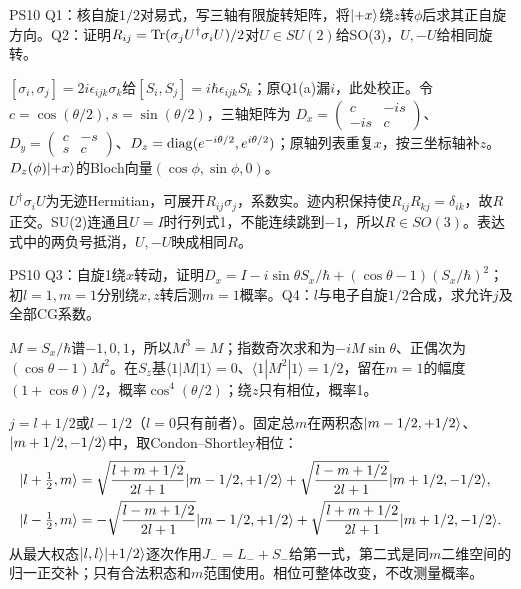 \begin{exercise}
PS10 Q1：核自旋$1/2$对易式，写三轴有限旋转矩阵，将$\lvert +x\rangle$绕$z$转$\phi$后求其正自旋方向。Q2：证明$R_{ij}=\operatorname{Tr}(\sigma_jU^\dagger\sigma_iU)/2$对$U\in SU(2)$给SO(3)，$U,-U$给相同旋转。
\end{exercise}
\begin{solution}
$[\sigma_i,\sigma_j]=2i\epsilon_{ijk}\sigma_k$给$[S_i,S_j]=i\hbar\epsilon_{ijk}S_k$；原Q1(a)漏$i$，此处校正。令$c=\cos(\theta/2),s=\sin(\theta/2)$，三轴矩阵为
$D_x=\begin{pmatrix}c&-is\\-is&c\end{pmatrix}$、$D_y=\begin{pmatrix}c&-s\\s&c\end{pmatrix}$、$D_z=\operatorname{diag}(e^{-i\theta/2},e^{i\theta/2})$；原轴列表重复$x$，按三坐标轴补$z$。$D_z(\phi)\lvert +x\rangle$的Bloch向量$(\cos\phi,\sin\phi,0)$。

$U^\dagger\sigma_iU$为无迹Hermitian，可展开$R_{ij}\sigma_j$，系数实。迹内积保持使$R_{ij}R_{kj}=\delta_{ik}$，故$R$正交。SU(2)连通且$U=I$时行列式1，不能连续跳到$-1$，所以$R\in SO(3)$。表达式中的两负号抵消，$U,-U$映成相同$R$。
\end{solution}
\begin{exercise}
PS10 Q3：自旋1绕$x$转动，证明$D_x=I-i\sin\theta S_x/\hbar+(\cos\theta-1)(S_x/\hbar)^2$；初$l=1,m=1$分别绕$x,z$转后测$m=1$概率。Q4：$l$与电子自旋$1/2$合成，求允许$j$及全部CG系数。
\end{exercise}
\begin{solution}
$M=S_x/\hbar$谱$-1,0,1$，所以$M^3=M$；指数奇次求和为$-iM\sin\theta$、正偶次为$(\cos\theta-1)M^2$。在$S_z$基$\langle1|M|1\rangle=0$、$\langle1|M^2|1\rangle=1/2$，留在$m=1$的幅度$(1+\cos\theta)/2$，概率$\cos^4(\theta/2)$；绕$z$只有相位，概率1。

$j=l+1/2$或$l-1/2$（$l=0$只有前者）。固定总$m$在两积态$\lvert m-1/2,+1/2\rangle$、$\lvert m+1/2,-1/2\rangle$中，取Condon--Shortley相位：
\[
\begin{aligned}
\lvert l+\tfrac12,m\rangle&=\sqrt{\frac{l+m+1/2}{2l+1}}\lvert m-1/2,+1/2\rangle
+\sqrt{\frac{l-m+1/2}{2l+1}}\lvert m+1/2,-1/2\rangle,\\
\lvert l-\tfrac12,m\rangle&=-\sqrt{\frac{l-m+1/2}{2l+1}}\lvert m-1/2,+1/2\rangle
+\sqrt{\frac{l+m+1/2}{2l+1}}\lvert m+1/2,-1/2\rangle.
\end{aligned}
\]
从最大权态$\lvert l,l\rangle\lvert +1/2\rangle$逐次作用$J_-=L_-+S_-$给第一式，第二式是同$m$二维空间的归一正交补；只有合法积态和$m$范围使用。相位可整体改变，不改测量概率。
\end{solution}

